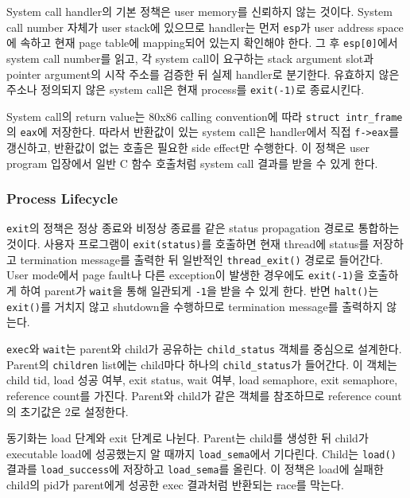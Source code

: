 \documentclass[conference]{IEEEtran}
\newcommand{\codefont}[1]{\texttt{\color{darkmagenta}#1}}
\begin{document}
System call handler의 기본 정책은 user memory를 신뢰하지 않는 것이다. System call number 자체가 user stack에 있으므로 handler는 먼저 \codefont{esp}가 user address space에 속하고 현재 page table에 mapping되어 있는지 확인해야 한다. 그 후 \codefont{esp[0]}에서 system call number를 읽고, 각 system call이 요구하는 stack argument slot과 pointer argument의 시작 주소를 검증한 뒤 실제 handler로 분기한다. 유효하지 않은 주소나 정의되지 않은 system call은 현재 process를 \codefont{exit(-1)}로 종료시킨다.

System call의 return value는 80x86 calling convention에 따라 \codefont{struct intr\_frame}의 \codefont{eax}에 저장한다. 따라서 반환값이 있는 system call은 handler에서 직접 \codefont{f-\textgreater{}eax}를 갱신하고, 반환값이 없는 호출은 필요한 side effect만 수행한다. 이 정책은 user program 입장에서 일반 C 함수 호출처럼 system call 결과를 받을 수 있게 한다.

\subsubsection{Process Lifecycle}

\codefont{exit}의 정책은 정상 종료와 비정상 종료를 같은 status propagation 경로로 통합하는 것이다. 사용자 프로그램이 \codefont{exit(status)}를 호출하면 현재 thread에 status를 저장하고 termination message를 출력한 뒤 일반적인 \codefont{thread\_exit()} 경로로 들어간다. User mode에서 page fault나 다른 exception이 발생한 경우에도 \codefont{exit(-1)}을 호출하게 하여 parent가 \codefont{wait}을 통해 일관되게 \codefont{-1}을 받을 수 있게 한다. 반면 \codefont{halt()}는 \codefont{exit()}를 거치지 않고 shutdown을 수행하므로 termination message를 출력하지 않는다.

\codefont{exec}와 \codefont{wait}는 parent와 child가 공유하는 \codefont{child\_status} 객체를 중심으로 설계한다. Parent의 \codefont{children} list에는 child마다 하나의 \codefont{child\_status}가 들어간다. 이 객체는 child tid, load 성공 여부, exit status, wait 여부, load semaphore, exit semaphore, reference count를 가진다. Parent와 child가 같은 객체를 참조하므로 reference count의 초기값은 2로 설정한다.

동기화는 load 단계와 exit 단계로 나뉜다. Parent는 child를 생성한 뒤 child가 executable load에 성공했는지 알 때까지 \codefont{load\_sema}에서 기다린다. Child는 \codefont{load()} 결과를 \codefont{load\_success}에 저장하고 \codefont{load\_sema}를 올린다. 이 정책은 load에 실패한 child의 pid가 parent에게 성공한 exec 결과처럼 반환되는 race를 막는다.
\end{document}
